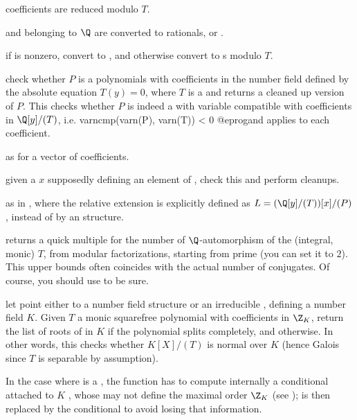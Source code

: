 \item {} coefficients are reduced modulo $T$.

\item {} and  belonging to $\Q$ are converted to rationals,
 or .

\item if  is nonzero, convert  to ,
and otherwise convert  to s modulo $T$.

 check whether
$P$ is a polynomials with coefficients in the number field defined by the
absolute equation $T(y) = 0$, where $T$ is a  and returns a cleaned
up version of $P$. This checks whether $P$ is indeed a 
with variable compatible with coefficients in $\Q[y]/(T)$, i.e.
\bprog
  varncmp(varn(P), varn(T)) < 0
@eprog\noindent and applies  to each coefficient.

 as 
for a vector of coefficients.

 given
a  $x$ supposedly defining an element of , check this
and perform  cleanups.

as in , where the relative extension is explicitly
defined as $L = (\Q[y]/(T))[x]/(P)$, instead of by an  structure.

 returns a quick
multiple for the number of  $\Q$-automorphism of the (integral, monic)
 $T$, from modular factorizations, starting from prime 
(you can set it to $2$). This upper bounds often coincides with the
actual number of conjugates. Of course, you should use 
to be sure.

 let  point
either to a number field structure or an irreducible , defining
a number field $K$. Given $T$ a monic squarefree polynomial with
coefficients in $\Z_K$, return the list of roots of  in $K$
if the polynomial splits completely, and  otherwise.
In other words, this checks whether $K[X]/(T)$ is normal over $K$ (hence
Galois since $T$ is separable by assumption).

In the case where  is a , the function has to compute
internally a conditional  attached to $K$ , whose  may not
define the maximal order $\Z_K$ (see );  is then
replaced by the conditional  to avoid losing that information.

